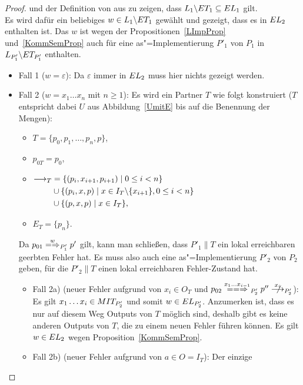 \begin{proof}
  und der Definition von \EL{} aus zu zeigen, dass $L_1\backslash ET
  _1\subseteq EL _1$ gilt.\\
  Es wird dafür ein beliebiges $w\in L_1\backslash ET _1$ gewählt und gezeigt,
  dass es in $EL _2$ enthalten ist. Das $w$ ist wegen der
  Propositionen~\ref{LImpProp} und~\ref{KommSemProp} auch für eine
  as"=Implementierung $P'_1$ von $P_1$ in $L_{P'_1}\backslash ET _{P'_1}$
  enthalten.
  \begin{itemize}
    \item Fall 1 ($w=\varepsilon$): Da $\varepsilon$ immer in $EL _2$ muss
      hier nichts gezeigt werden.
    \item Fall 2 ($w=x_1\dots x_n$ mit $n\geq 1$): Es wird ein Partner $T$ wie
      folgt konstruiert ($T$ entspricht dabei $U$ aus Abbildung~\ref{UmitE} bis
      auf die Benennung der Mengen):
      \begin{itemize}
        \item $T=\{p_0,p_1,\dots ,p_n,p\}$,
        \item $p_{0T}=p_0$,
        \item $\begin{aligned}[t]
            \must _T&=\{(p_i,x_{i+1},p_{i+1})\mid 0\leq i< n\}\\
            &\cup\{(p_i,x,p)\mid x\in I_T\backslash\{x_{i+1}\},0\leq i< n\}\\
            &\cup\{(p,x,p)\mid x\in I_T\},
        \end{aligned}$
        \item $E_T=\{p_n\}$.
      \end{itemize}
      Da $p_{01} \weakmay[w]_{P'_1} p'$ gilt, kann man schließen, dass
      $P'_1\|T$ ein lokal erreichbaren geerbten Fehler hat. Es muss also auch
      eine as"=Implementierung $P'_2$ von $P_2$ geben, für die $P'_2\|T$ einen
      lokal erreichbaren Fehler-Zustand hat.
      \begin{itemize}
        \item Fall 2a) (neuer Fehler aufgrund von $x_i\in O_T$ und $p_{02}
          \lweakmay[x_1\dots x_{i-1}]_{P'_2}p''\nmust[x_i]_{P'_2}$): Es gilt
          $x_1\dots x_i\in MIT _{P'_2}$ und somit $w\in EL _{P'_2}$. Anzumerken
          ist, dass es nur auf diesem Weg Outputs von $T$ möglich sind, deshalb
          gibt es keine anderen Outputs von $T$, die zu einem neuen Fehler
          führen können. Es gilt $w\in EL _2$ wegen
          Proposition~\ref{KommSemProp}.
        \item Fall 2b) (neuer Fehler aufgrund von $a\in O=I_T$): Der einzige

\end{itemize}
\end{itemize}
\end{proof}
